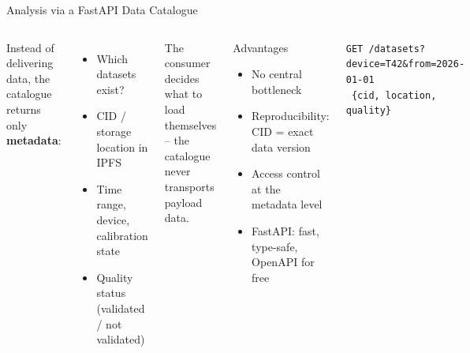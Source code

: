 \documentclass[aspectratio=169]{beamer}
\begin{document}
\begin{frame}{Analysis via a FastAPI Data Catalogue}
  \begin{columns}
      Instead of delivering data, the catalogue returns only \textbf{metadata}:
      \begin{itemize}
        \item Which datasets exist?
        \item CID / storage location in IPFS
        \item Time range, device, calibration state
        \item Quality status (validated / not validated)
      \end{itemize}
      \vspace{0.5em}
      The consumer decides what to load themselves –
      the catalogue never transports payload data.
      \begin{block}{Advantages}
        \begin{itemize}
          \item No central bottleneck
          \item Reproducibility: CID = exact data version
          \item Access control at the metadata level
          \item FastAPI: fast, type-safe, OpenAPI for free
        \end{itemize}
      \end{block}
      \begin{exampleblock}{}
        \texttt{GET /datasets?device=T42\&from=2026-01-01}\\
        \texttt{ \{cid, location, quality\}}
      \end{exampleblock}
  \end{columns}
\end{frame}
\end{document}
